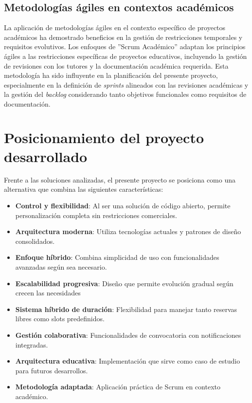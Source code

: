 \subsection{Metodologías ágiles en contextos académicos}\label{metodologias-agiles-contextos-academicos}
La aplicación de metodologías ágiles en el contexto específico de proyectos académicos ha demostrado beneficios en la gestión de restricciones temporales y requisitos evolutivos. Los enfoques de ''Scrum Académico'' adaptan los principios ágiles a las restricciones específicas de proyectos educativos, incluyendo la gestión de revisiones con los tutores y la documentación académica requerida.
Esta metodología ha sido influyente en la planificación del presente proyecto, especialmente en la definición de \emph{sprints} alineados con las revisiones académicas y la gestión del \emph{backlog} considerando tanto objetivos funcionales como requisitos de documentación.\\

\section{Posicionamiento del proyecto desarrollado}\label{posicionamiento-proyecto-desarrollado}
Frente a las soluciones analizadas, el presente proyecto se posiciona como una alternativa que combina las siguientes características:

\begin{itemize}
\tightlist
\item
\textbf{Control y flexibilidad}: Al ser una solución de código abierto, permite personalización completa sin restricciones comerciales.
\item
\textbf{Arquitectura moderna}: Utiliza tecnologías actuales y patrones de diseño consolidados.
\item
\textbf{Enfoque híbrido}: Combina simplicidad de uso con funcionalidades avanzadas según sea necesario.
\item
\textbf{Escalabilidad progresiva}: Diseño que permite evolución gradual según crecen las necesidades
\item
\textbf{Sistema híbrido de duración}: Flexibilidad para manejar tanto reservas libres como slots predefinidos.
\item
\textbf{Gestión colaborativa}: Funcionalidades de convocatoria con notificaciones integradas.
\item
\textbf{Arquitectura educativa}: Implementación que sirve como caso de estudio para futuros desarrollos.
\item
\textbf{Metodología adaptada}: Aplicación práctica de Scrum en contexto académico.
\end{itemize}

